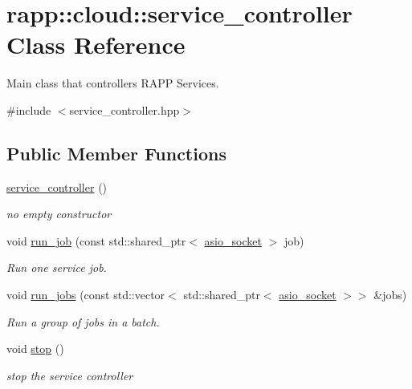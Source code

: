 \hypertarget{classrapp_1_1cloud_1_1service__controller}{\section{rapp\-:\-:cloud\-:\-:service\-\_\-controller Class Reference}
\label{classrapp_1_1cloud_1_1service__controller}
}


Main class that controllers R\-A\-P\-P Services.  




{\ttfamily \#include $<$service\-\_\-controller.\-hpp$>$}

\subsection*{Public Member Functions}
\begin{DoxyCompactItemize}
\item 
\hyperlink{classrapp_1_1cloud_1_1service__controller_a61ed62dfff1175f312c89056690f4a54}{service\-\_\-controller} ()
\begin{DoxyCompactList}\small\item\em no empty constructor \end{DoxyCompactList}\item 
void \hyperlink{classrapp_1_1cloud_1_1service__controller_aaec041d0f4df40abda2e17f88b895ca2}{run\-\_\-job} (const std\-::shared\-\_\-ptr$<$ \hyperlink{classrapp_1_1cloud_1_1asio__socket}{asio\-\_\-socket} $>$ job)
\begin{DoxyCompactList}\small\item\em Run one service job. \end{DoxyCompactList}\item 
void \hyperlink{classrapp_1_1cloud_1_1service__controller_acaab91110259314722958a57e2aa6963}{run\-\_\-jobs} (const std\-::vector$<$ std\-::shared\-\_\-ptr$<$ \hyperlink{classrapp_1_1cloud_1_1asio__socket}{asio\-\_\-socket} $>$$>$ \&jobs)
\begin{DoxyCompactList}\small\item\em Run a group of jobs in a batch. \end{DoxyCompactList}\item 
void \hyperlink{classrapp_1_1cloud_1_1service__controller_afb25b43a525c321557455f29f3d59db9}{stop} ()
\begin{DoxyCompactList}\small\item\em stop the service controller \end{DoxyCompactList}\end{DoxyCompactItemize}
